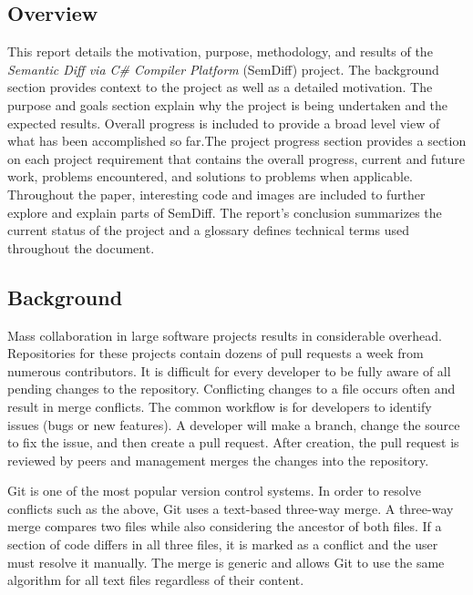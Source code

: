 \documentclass[draftclsnofoot,onecolumn]{IEEEtran}
\begin{document}
\subsection{Overview}%

This report details the motivation, purpose, methodology, and results of the \textit{Semantic Diff via C\# Compiler Platform} (SemDiff) project. The background section provides context to the project as well as a detailed motivation. The purpose and goals section explain why the project is being undertaken and the expected results. Overall progress is included to provide a broad level view of what has been accomplished so far.The project progress section provides a section on each project requirement that contains the overall progress, current and future work, problems encountered, and solutions to problems when applicable. Throughout the paper, interesting code and images are included to further explore and explain parts of SemDiff. The report's conclusion summarizes the current status of the project and a glossary defines technical terms used throughout the document.

\subsection{Background}%

Mass collaboration in large software projects results in considerable 
overhead. Repositories for these projects contain dozens of pull requests a 
week from numerous contributors. It is difficult for every developer to be 
fully aware of all pending changes to the repository. Conflicting changes to a 
file occurs often and result in merge conflicts. The common workflow is for 
developers to identify issues (bugs or new features). A developer will make 
a branch, change the source to fix the issue, and then create a pull request. 
After creation, the pull request is reviewed by peers and management merges the 
changes into the repository.

Git is one of the most popular version control systems. In order to resolve 
conflicts such as the above, Git uses a text-based three-way merge. A 
three-way merge compares two files while also considering the ancestor of 
both files. If a section of code differs in all three files, it is marked as a 
conflict and the user must resolve it manually. The merge is generic and 
allows Git to use the same algorithm for all text files regardless of their 
content.
\end{document}
